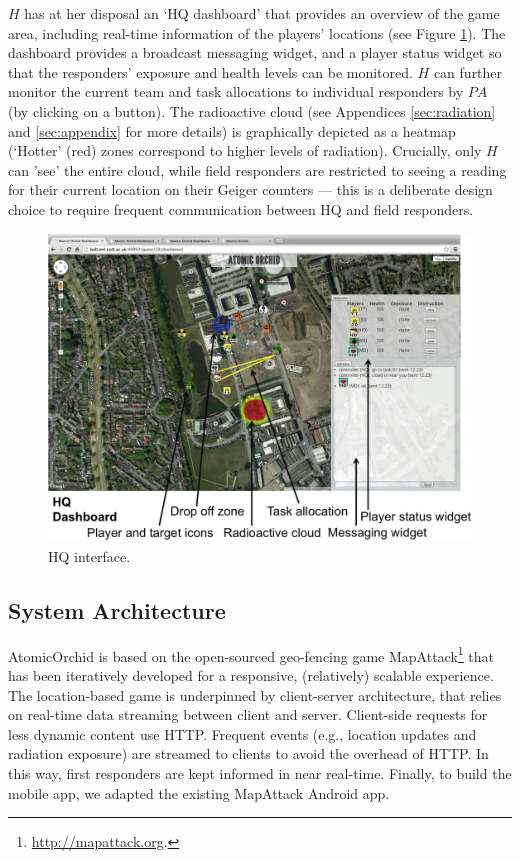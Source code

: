 $H$ has at her disposal an `HQ dashboard' that provides an over\-view of the game area, including real-time information of the players' locations (see Figure \ref{fig:ui2}). The dashboard provides a broadcast messaging widget, and a player status widget so that the responders' exposure and health levels can be monitored. $H$ can further monitor the  current team and task allocations to individual responders by $PA$ (by clicking on a button). The radioactive cloud (see Appendices \ref{sec:radiation} and \ref{sec:appendix} for more details) is graphically depicted as a heatmap (`Hotter'  (red) zones correspond to higher levels of radiation). Crucially, only  $H$ can 'see' the entire cloud, while field responders are restricted to seeing a reading for their current location on their Geiger counters --- this is a deliberate design choice to require frequent communication between HQ and field responders. 
\begin{figure}[htbp]
\includegraphics[width=\columnwidth]{dashboard.png}
\caption{HQ interface.}
\label{fig:ui2}
\end{figure}

\subsection{System Architecture}
\noindent AtomicOrchid is based on the open-sourced geo-fencing game MapAttack\footnote{\url{http://mapattack.org}.} that has been iteratively developed for a responsive, (relatively) scalable experience.  The location-based game is underpinned by client-server architecture, that relies on real-time data streaming between client and server. Client-side requests for less dynamic content use HTTP. Frequent events (e.g., location updates and radiation exposure) are streamed to clients to avoid the overhead of HTTP. In this way, first responders are kept informed in near real-time. Finally,  to build the mobile app, we adapted the existing MapAttack Android app.

